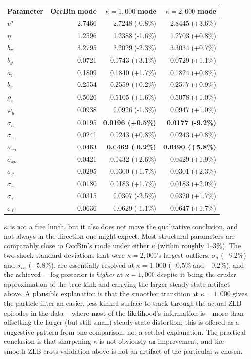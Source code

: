 \documentclass[11pt]{article}
\begin{document}
\begin{center}
\begin{tabular}{@{}lrrr@{}}
\toprule
Parameter & OccBin mode & $\kappa=1{,}000$ mode & $\kappa=2{,}000$ mode \\
\midrule
$v^a$          & 2.7466 & 2.7248 (-0.8\%) & 2.8445 (+3.6\%) \\
$\eta$         & 1.2596 & 1.2388 (-1.6\%) & 1.2703 (+0.8\%) \\
$b_\pi$        & 3.2795 & 3.2029 (-2.3\%) & 3.3034 (+0.7\%) \\
$b_y$          & 0.0721 & 0.0743 (+3.1\%) & 0.0729 (+1.1\%) \\
$a_i$          & 0.1809 & 0.1840 (+1.7\%) & 0.1824 (+0.8\%) \\
$b_r$          & 0.2554 & 0.2559 (+0.2\%) & 0.2577 (+0.9\%) \\
$\rho_z$       & 0.5026 & 0.5105 (+1.6\%) & 0.5078 (+1.0\%) \\
$\varphi_b$    & 0.0938 & 0.0926 (-1.3\%) & 0.0947 (+1.0\%) \\
\midrule
$\sigma_a$     & 0.0195 & \textbf{0.0196 (+0.5\%)} & \textbf{0.0177 (-9.2\%)} \\
$\sigma_z$     & 0.0241 & 0.0243 (+0.8\%) & 0.0243 (+0.8\%) \\
$\sigma_{va}$  & 0.0463 & \textbf{0.0462 (-0.2\%)} & \textbf{0.0490 (+5.8\%)} \\
$\sigma_{xa}$  & 0.0421 & 0.0432 (+2.6\%) & 0.0429 (+1.9\%) \\
$\sigma_g$     & 0.0295 & 0.0300 (+1.7\%) & 0.0301 (+2.3\%) \\
$\sigma_r$     & 0.0180 & 0.0183 (+1.7\%) & 0.0183 (+2.0\%) \\
$\sigma_\tau$  & 0.0315 & 0.0307 (-2.5\%) & 0.0320 (+1.7\%) \\
$\sigma_L$     & 0.0636 & 0.0629 (-1.1\%) & 0.0647 (+1.7\%) \\
\bottomrule
\end{tabular}
\end{center}

$\kappa$ is not a free lunch, but it also does not move the qualitative
conclusion, and not always in the direction one might expect. Most
structural parameters are comparably close to OccBin's mode under either
$\kappa$ (within roughly 1--3\%). The two shock standard deviations that
were $\kappa=2{,}000$'s largest outliers, $\sigma_a$ ($-9.2\%$) and
$\sigma_{va}$ ($+5.8\%$), are essentially resolved at $\kappa=1{,}000$
($+0.5\%$ and $-0.2\%$), and the achieved $-\log\text{posterior}$ is
\emph{higher} at $\kappa=1{,}000$ despite it being the cruder
approximation of the true kink and carrying the larger steady-state
artifact above. A plausible explanation is that the smoother transition
at $\kappa=1{,}000$ gives the particle filter an easier, less kinked
surface to track through the actual ZLB episodes in the data -- where
most of the likelihood's information is -- more than offsetting the
larger (but still small) steady-state distortion; this is offered as a
suggestive pattern from one comparison, not a settled explanation. The
practical conclusion is that sharpening $\kappa$ is not obviously an
improvement, and the smooth-ZLB cross-validation above is not an artifact
of the particular $\kappa$ chosen.
\end{document}
